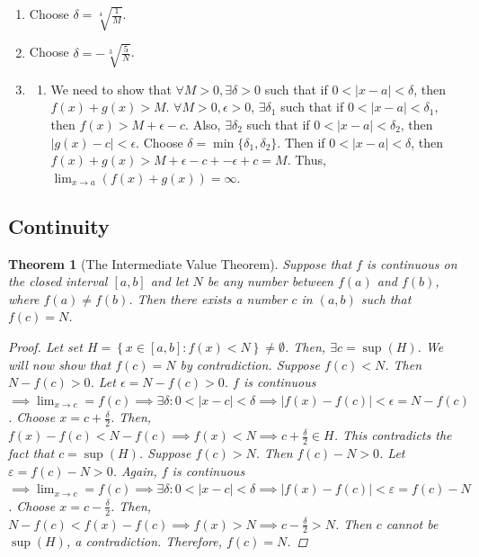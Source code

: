 \documentclass{article}
\newtheorem*{theorem*}{Theorem}
\begin{document}
\begin{enumerate}
        contradicts $L<\frac{1}{2}$, so $\lim_{x\to0}f(x)$ does not exist.
        \setcounter{enumi}{41}
  \item Choose $\delta=\sqrt[4]{\frac{1}{M}}$.
  \item Choose $\delta=-\sqrt[3]{\frac{5}{N}}$.
  \item \begin{enumerate}
          \item We need to show that $\forall M > 0, \exists\delta>0$ such that if $0<
                  |x-a|<\delta$, then $f(x)+g(x)>M$. $\forall M>0, \epsilon>0$, $\exists
                  \delta_1$ such that if $0<|x-a|<\delta_1$, then $f(x)>M+\epsilon-c$.
                Also, $\exists\delta_2$ such that if $0<|x-a|<\delta_2$, then $|g(x)-c|<
                  \epsilon$. Choose $\delta=\min\{\delta_1, \delta_2\}$. Then if
                $0<|x-a|<\delta$, then $f(x)+g(x)>M+\epsilon-c + -\epsilon+c = M$. Thus,
                $\lim_{x \to a}(f(x)+g(x)) = \infty$.
        \end{enumerate}
\end{enumerate}

\subsection{Continuity}
\begin{theorem*}[The Intermediate Value Theorem]
  Suppose that $f$ is continuous on the closed interval $[a, b]$ and let $N$ be any number
  between $f(a)$ and $f(b)$, where $f(a) \neq f(b)$. Then there exists a number $c$ in $(a, b)$
  such that $f(c) = N$.
  \begin{proof}
    Let set $H = \left\{x\in[a,b]:f(x)<N\right\} \neq \emptyset$. Then, $\exists c =
      \sup(H)$. We will now show that $f(c) = N$ by contradiction. Suppose $f(c) < N$.
    Then $N-f(c)>0$. Let $\epsilon=N-f(c)>0$. $f$ is continuous $\implies \lim_{x \to c} =
      f(c)\implies\exists\delta: 0<|x-c|<\delta\implies|f(x)-f(c)|<\epsilon=N-f(c)$.
    Choose $x=c+\frac{\delta}{2}$. Then, $f(x)-f(c)<N-f(c)\implies f(x)<N\implies c+
      \frac{\delta}{2}\in H$. This contradicts the fact that $c=\sup(H)$. Suppose $f(c)
      > N$. Then $f(c)-N>0$. Let $\varepsilon=f(c)-N>0$. Again, $f$ is continuous
    $\implies\lim_{x \to c}=f(c)\implies\exists\delta: 0<|x-c|<\delta\implies|f(x)-f(c)|<
      \varepsilon=f(c)-N$. Choose $x=c-\frac{\delta}{2}$. Then, $N-f(c)<f(x)-f(c)
      \implies f(x)>N\implies c-\frac{\delta}{2}>N$. Then $c$ cannot be $\sup(H)$, a
    contradiction. Therefore, $f(c) = N$.
  \end{proof}
\end{theorem*}
\end{document}
